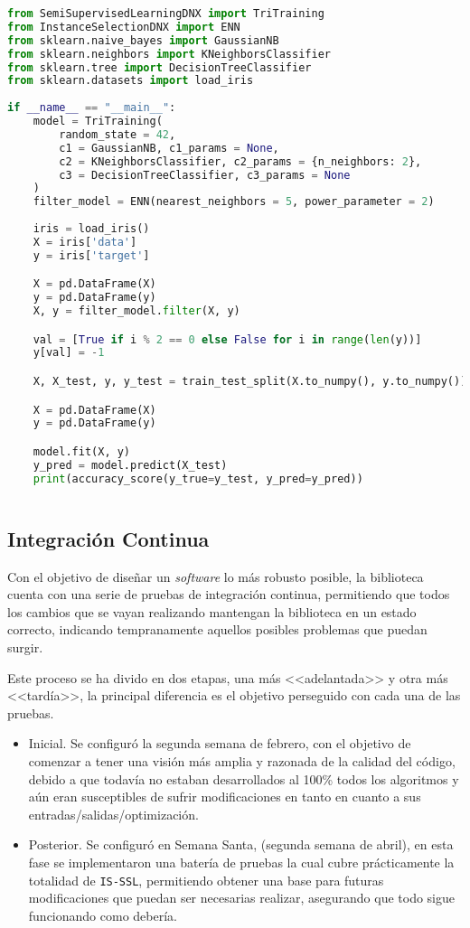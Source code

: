 \begin{lstlisting}[language=Python, caption={Ejemplo de uso de IS-SSL}, label={lst:ejemplo}]
from SemiSupervisedLearningDNX import TriTraining
from InstanceSelectionDNX import ENN
from sklearn.naive_bayes import GaussianNB
from sklearn.neighbors import KNeighborsClassifier
from sklearn.tree import DecisionTreeClassifier
from sklearn.datasets import load_iris
	
if __name__ == "__main__":
	model = TriTraining(
		random_state = 42,
		c1 = GaussianNB, c1_params = None,
		c2 = KNeighborsClassifier, c2_params = {n_neighbors: 2},
		c3 = DecisionTreeClassifier, c3_params = None	
	)
	filter_model = ENN(nearest_neighbors = 5, power_parameter = 2)
	
	iris = load_iris()
	X = iris['data']
	y = iris['target']

	X = pd.DataFrame(X)
	y = pd.DataFrame(y)
	X, y = filter_model.filter(X, y)

	val = [True if i % 2 == 0 else False for i in range(len(y))]
	y[val] = -1

	X, X_test, y, y_test = train_test_split(X.to_numpy(), y.to_numpy())

	X = pd.DataFrame(X)
	y = pd.DataFrame(y)

	model.fit(X, y)
	y_pred = model.predict(X_test)
	print(accuracy_score(y_true=y_test, y_pred=y_pred))
	
\end{lstlisting}
\pagebreak

\subsection{Integración Continua}
Con el objetivo de diseñar un \textit{software} lo más robusto posible, la biblioteca cuenta con una serie de pruebas de integración continua, permitiendo que todos los cambios que se vayan realizando mantengan la biblioteca en un estado correcto, indicando tempranamente aquellos posibles problemas que puedan surgir.

Este proceso se ha divido en dos etapas, una más <<adelantada>> y otra más <<tardía>>, la principal diferencia es el objetivo perseguido con cada una de las pruebas. 
\begin{itemize}
\item Inicial. Se configuró la segunda semana de febrero, con el objetivo de comenzar a tener una visión más amplia y razonada de la calidad del código, debido a que todavía no estaban desarrollados al 100\% todos los algoritmos y aún eran susceptibles de sufrir modificaciones en tanto en cuanto a sus entradas/salidas/optimización. 
\item Posterior. Se configuró en Semana Santa, (segunda semana de abril), en esta fase se implementaron una batería de pruebas la cual cubre prácticamente la totalidad de \texttt{IS-SSL}, permitiendo obtener una base para futuras modificaciones que puedan ser necesarias realizar, asegurando que todo sigue funcionando como debería.
\end{itemize}

